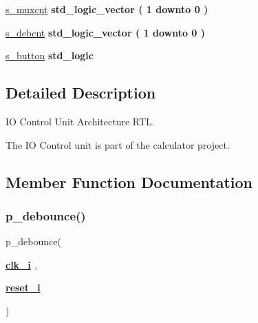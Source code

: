 \begin{DoxyCompactItemize}
\item 
\hyperlink{classio__ctrl_1_1rtl_a8ccbdb26e3f7c6ca59e3b30524abd69a}{s\+\_\+muxcnt} {\bfseries \textcolor{comment}{std\+\_\+logic\+\_\+vector}\textcolor{vhdlchar}{ }\textcolor{vhdlchar}{(}\textcolor{vhdlchar}{ }\textcolor{vhdlchar}{ } \textcolor{vhdldigit}{1} \textcolor{vhdlchar}{ }\textcolor{keywordflow}{downto}\textcolor{vhdlchar}{ }\textcolor{vhdlchar}{ } \textcolor{vhdldigit}{0} \textcolor{vhdlchar}{ }\textcolor{vhdlchar}{)}\textcolor{vhdlchar}{ }} 
\item 
\hyperlink{classio__ctrl_1_1rtl_a9a9efdd64179e1002b1483066213801a}{s\+\_\+debcnt} {\bfseries \textcolor{comment}{std\+\_\+logic\+\_\+vector}\textcolor{vhdlchar}{ }\textcolor{vhdlchar}{(}\textcolor{vhdlchar}{ }\textcolor{vhdlchar}{ } \textcolor{vhdldigit}{1} \textcolor{vhdlchar}{ }\textcolor{keywordflow}{downto}\textcolor{vhdlchar}{ }\textcolor{vhdlchar}{ } \textcolor{vhdldigit}{0} \textcolor{vhdlchar}{ }\textcolor{vhdlchar}{)}\textcolor{vhdlchar}{ }} 
\item 
\hyperlink{classio__ctrl_1_1rtl_a836b188aedf20a856e51efb3d9d5282f}{s\+\_\+button} {\bfseries \textcolor{comment}{std\+\_\+logic}\textcolor{vhdlchar}{ }} 
\end{DoxyCompactItemize}


\subsection{Detailed Description}
IO Control Unit Architecture R\+TL. 

The IO Control unit is part of the calculator project. 

\subsection{Member Function Documentation}
\mbox{\label{classio__ctrl_1_1rtl_a627aed9352c04ffc84d1b682c4da9ba5}} 
\subsubsection{\texorpdfstring{p\+\_\+debounce()}{p\_debounce()}}
{\footnotesize\ttfamily  {\bfseries \textcolor{vhdlchar}{ }} p\+\_\+debounce(\begin{DoxyParamCaption}\item[{}]{{\bfseries {\bfseries \hyperlink{classio__ctrl_abe949478e3f8aad0a6aeb1842fa6c608}{clk\+\_\+i}} \textcolor{vhdlchar}{ }} {\em } ,  }\item[{}]{{\bfseries {\bfseries \hyperlink{classio__ctrl_a55da7e76960757f8c6842e86a28ee7be}{reset\+\_\+i}} \textcolor{vhdlchar}{ }} {\em } }\end{DoxyParamCaption})\hspace{0.3cm}{\ttfamily [Process]}}



